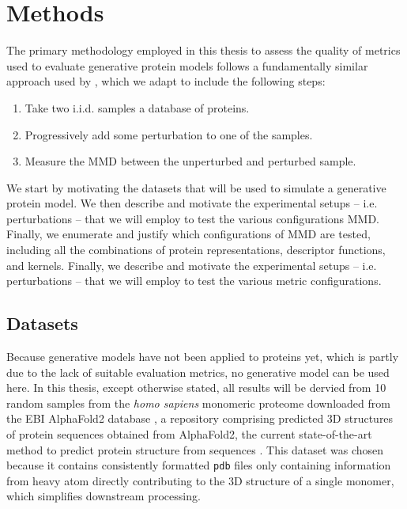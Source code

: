 \chapter{Methods}


The primary methodology employed in this thesis to assess the quality of metrics
used to evaluate generative protein models follows a fundamentally similar
approach used by \cite{o2021evaluation}, which we adapt to include the following
steps:

\begin{enumerate}
\item Take two i.i.d. samples a database of proteins.
\item Progressively add some perturbation to one of the samples.
\item Measure the MMD between the unperturbed and perturbed sample.
\end{enumerate}

We start by motivating the datasets that will be used to simulate a generative
protein model. We then describe and motivate the experimental setups -- i.e.
perturbations -- that we will employ to test the various configurations MMD.
Finally, we enumerate and justify which configurations of MMD are tested,
including all the combinations of protein representations, descriptor functions,
and kernels. Finally, we describe and motivate the experimental setups -- i.e.
perturbations -- that we will employ to test the various metric configurations.


\section{Datasets}

Because generative models have not been applied to proteins yet, which is partly
due to the lack of suitable evaluation metrics, no generative model can be used
here. In this thesis, except otherwise stated, all results will be dervied from
10 random samples from the \textit{homo sapiens} monomeric proteome downloaded
from the EBI AlphaFold2 database
\citep{varadi2022alphafold,tunyasuvunakool2021highly}, a repository comprising
predicted 3D structures of protein sequences obtained from AlphaFold2, the
current state-of-the-art method to predict protein structure from sequences
\citep{jumper2021highly}. This dataset was chosen because it contains
consistently formatted \texttt{pdb} files only containing information from
heavy atom directly contributing to the 3D structure of a single monomer, which
simplifies downstream processing.

